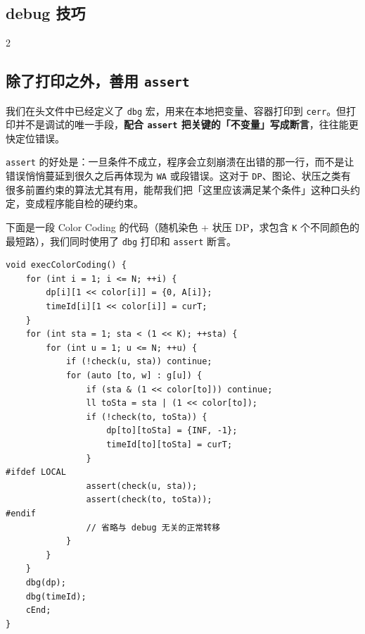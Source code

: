 	\begin{center}
		\section{debug 技巧}
	\end{center}

	\begin{multicols*}{2}

		\subsection{除了打印之外，善用 \texttt{assert}}

		我们在头文件中已经定义了 \texttt{dbg} 宏，用来在本地把变量、容器打印到 \texttt{cerr}。但打印并不是调试的唯一手段，\textbf{配合 \texttt{assert} 把关键的「不变量」写成断言}，往往能更快定位错误。

		\texttt{assert} 的好处是：一旦条件不成立，程序会立刻崩溃在出错的那一行，而不是让错误悄悄蔓延到很久之后再体现为 \texttt{WA} 或段错误。这对于 \texttt{DP}、图论、状压之类有很多前置约束的算法尤其有用，能帮我们把「这里应该满足某个条件」这种口头约定，变成程序能自检的硬约束。

		下面是一段 Color Coding 的代码（随机染色 + 状压 DP，求包含 \texttt{K} 个不同颜色的最短路），我们同时使用了 \texttt{dbg} 打印和 \texttt{assert} 断言。

		\begin{verbatim}
void execColorCoding() {
	for (int i = 1; i <= N; ++i) {
		dp[i][1 << color[i]] = {0, A[i]};
		timeId[i][1 << color[i]] = curT;
	}
	for (int sta = 1; sta < (1 << K); ++sta) {
		for (int u = 1; u <= N; ++u) {
			if (!check(u, sta)) continue;
			for (auto [to, w] : g[u]) {
				if (sta & (1 << color[to])) continue;
				ll toSta = sta | (1 << color[to]);
				if (!check(to, toSta)) {
					dp[to][toSta] = {INF, -1};
					timeId[to][toSta] = curT;
				}
#ifdef LOCAL
				assert(check(u, sta));
				assert(check(to, toSta));
#endif
				// 省略与 debug 无关的正常转移
			}
		}
	}
	dbg(dp);
	dbg(timeId);
	cEnd;
}
		\end{verbatim}




\end{multicols*}
